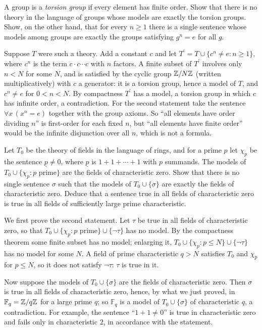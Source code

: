 \begin{exercise}\label{logic:exercise-torsion-groups}
A group is a \emph{torsion group} if every element has finite order. Show that
there is no theory in the language of groups whose models are exactly the
torsion groups. Show, on the other hand, that for every $n \geq 1$ there is a
single sentence whose models among groups are exactly the groups satisfying
$g^n = e$ for all $g$.
\end{exercise}

\begin{solution}
Suppose $T$ were such a theory. Add a constant $c$ and let $T^{\prime} = T \cup \{c^n \neq e : n \geq 1\}$, where $c^n$ is the term $c \cdot c \cdots c$ with $n$ factors. A finite subset of
$T^{\prime}$ involves only $n < N$ for some $N$, and is satisfied by the cyclic group $\mathbb{Z}/N\mathbb{Z}$ (written multiplicatively) with $c$ a generator: it is a torsion group, hence a model of
$T$, and $c^n \neq e$ for $0 < n < N$. By compactness $T^{\prime}$ has a model, a torsion group in which $c$ has infinite order, a contradiction. For the second statement take the
sentence $\forall x\,(x^n = e)$ together with the group axioms. So ``all elements have order dividing $n$'' is first-order for each fixed $n$, but ``all elements have finite
order'' would be the infinite disjunction over all $n$, which is not a formula.
\end{solution}

\begin{exercise}\label{logic:exercise-characteristic-zero}
Let $T_0$ be the theory of fields in the language of rings, and for a prime
$p$ let $\chi_p$ be the sentence $\underline{p} \neq 0$, where $\underline{p}$
is $1 + 1 + \cdots + 1$ with $p$ summands. The models of
$T_0 \cup \{\chi_p : p \text{ prime}\}$ are the fields of characteristic zero.
Show that there is no single sentence $\sigma$ such that the models of
$T_0 \cup \{\sigma\}$ are exactly the fields of characteristic zero. Deduce that
a sentence true in all fields of characteristic zero is true in all fields
of sufficiently large prime characteristic.
\end{exercise}

\begin{solution}
We first prove the second statement. Let $\tau$ be true in all fields of characteristic zero, so that $T_0 \cup \{\chi_p : p \text{ prime}\} \cup \{\neg\tau\}$ has no model. By the compactness
theorem some finite subset has no model; enlarging it, $T_0 \cup \{\chi_p : p \leq N\} \cup \{\neg\tau\}$ has no model for some $N$. A field of prime characteristic $q > N$ satisfies
$T_0$ and $\chi_p$ for $p \leq N$, so it does not satisfy $\neg\tau$: $\tau$ is true in it.

Now suppose the models of $T_0 \cup \{\sigma\}$ are the fields of characteristic zero. Then $\sigma$ is true in all fields of characteristic zero, hence, by what we just proved, in
$\mathbb{F}_q = \mathbb{Z}/q\mathbb{Z}$ for a large prime $q$; so $\mathbb{F}_q$ is a model of $T_0 \cup \{\sigma\}$ of characteristic $q$, a contradiction. For example, the sentence ``$1 + 1 \neq 0$'' is
true in characteristic zero and fails only in characteristic $2$, in accordance with the statement.
\end{solution}

